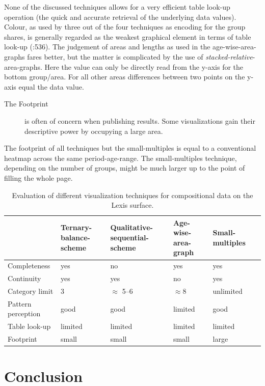 \documentclass[a4paper, 12pt]{scrartcl}
\begin{document}
None of the discussed techniques allows for a very efficient table look-up operation (the quick and accurate retrieval of the underlying data values). Colour, as used by three out of the four techniques as encoding for the group shares, is generally regarded as the weakest graphical element in terms of table look-up (\cite{Cleveland1984}:536). The judgement of areas and lengths as used in the age-wise-area-graphs fares better, but the matter is complicated by the use of \emph{stacked-relative}-area-graphs. Here the value can only be directly read from the y-axis for the bottom group/area. For all other areas differences between two points on the y-axis equal the data value.

\begin{description}
  \item[The Footprint] is often of concern when publishing results. Some visualizations gain their descriptive power by occupying a large area.
\end{description}

The footprint of all techniques but the small-multiples is equal to a conventional heatmap across the same period-age-range. The small-multiples technique, depending on the number of groups, might be much larger up to the point of filling the whole page.

\begin{table}[!htb]
\tabformat
\begin{tabular}{p{3.5cm}*5{Q{1.5cm}}}
\toprule
 & Ternary-balance-scheme & Qualitative-sequential-scheme & Age-wise-area-graph & Small-multiples \\
\midrule
Completeness & yes & no & yes & yes \\
Continuity & yes & yes & no & yes \\
Category limit & 3 & $\approx$ 5--6 & $\approx 8$ & unlimited \\
Pattern perception & good & good & limited & good \\
Table look-up & limited & limited & limited & limited \\
Footprint & small & small & small & large \\
\bottomrule
\end{tabular}
\caption{Evaluation of different visualization techniques for compositional data on the Lexis surface.}
\label{tab:eval}
\end{table}

\clearpage

\section{Conclusion} %
\label{sec:con}
\end{document}
